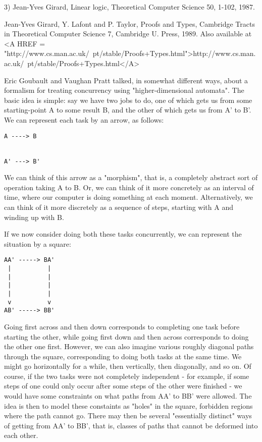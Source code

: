 3) Jean-Yves Girard, Linear logic, Theoretical Computer Science 50,
1-102, 1987.

Jean-Yves Girard, Y. Lafont and P. Taylor, Proofs and Types, Cambridge
Tracts in Theoretical Computer Science 7, Cambridge U. Press, 1989.
Also available at <A HREF = "http://www.cs.man.ac.uk/~pt/stable/Proofs+Types.html">http://www.cs.man.ac.uk/~pt/stable/Proofs+Types.html</A>

Eric Goubault and Vaughan Pratt talked, in somewhat different ways,
about a formalism for treating concurrency using "higher-dimensional
automata".  The basic idea is simple: say we have two jobs to do, one of
which gets us from some starting-point A to some result B, and the other
of which gets us from A' to B'.  We can represent each task by an arrow,
as follows:

\begin{verbatim}
A ----> B


A' ---> B'
\end{verbatim}
    

We can think of this arrow as a "morphism", that is, a completely abstract
sort of operation taking A to B.  Or, we can think of it more concretely
as an interval of time, where our computer is doing something at each
moment.  Alternatively, we can think of it more discretely as a sequence
of steps, starting with A and winding up with B.  

If we now consider doing both these tasks concurrently, we can represent the
situation by a square:

\begin{verbatim}
AA' -----> BA'
 |          |
 |          |
 |          |
 |          |
 v          v
AB' -----> BB'
\end{verbatim}
    

Going first across and then down corresponds to completing one task
before starting the other, while going first down and then across
corresponds to doing the other one first.  However, we can also imagine
various roughly diagonal paths through the square, corresponding to
doing both tasks at the same time.  We might go horizontally for a
while, then vertically, then diagonally, and so on.  Of course, if the
two tasks were not completely independent - for example, if some steps
of one could only occur after some steps of the other were finished -
we would have some constraints on what paths from AA' to BB' were
allowed.  The idea is then to model these constaints as "holes" in the
square, forbidden regions where the path cannot go.  There may then be
several "essentially distinct" ways of getting from AA' to BB', that is,
classes of paths that cannot be deformed into each other.  


